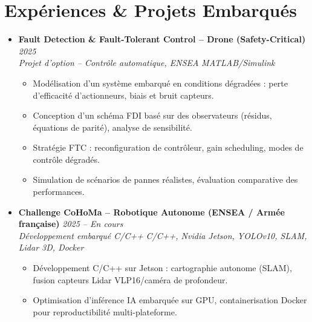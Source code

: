 \documentclass[a4paper,11pt]{article}
\begin{document}
\section{Expériences \& Projets Embarqués}
\begin{itemize}[leftmargin=*, label={-}]

\item \textbf{Fault Detection \& Fault-Tolerant Control -- Drone (Safety-Critical)} \hfill \textit{2025} \\
\textit{Projet d'option -- Contrôle automatique, ENSEA} \hfill \textit{MATLAB/Simulink}
\vspace{-2pt}
    \begin{itemize}[leftmargin=0.4cm, nosep, label=\tiny$\bullet$]
        \item \small{Modélisation d'un système embarqué en conditions dégradées : perte d'efficacité d'actionneurs, biais et bruit capteurs.}
        \item \small{Conception d'un schéma FDI basé sur des observateurs (résidus, équations de parité), analyse de sensibilité.}
        \item \small{Stratégie FTC : reconfiguration de contrôleur, gain scheduling, modes de contrôle dégradés.}
        \item \small{Simulation de scénarios de pannes réalistes, évaluation comparative des performances.}
    \end{itemize}
\vspace{3pt}

\item \textbf{Challenge CoHoMa -- Robotique Autonome (ENSEA / Armée française)} \hfill \textit{2025 -- En cours} \\
\textit{Développement embarqué C/C++} \hfill \textit{C/C++, Nvidia Jetson, YOLOv10, SLAM, Lidar 3D, Docker}
\vspace{-2pt}
    \begin{itemize}[leftmargin=0.4cm, nosep, label=\tiny$\bullet$]
        \item \small{Développement C/C++ sur Jetson : cartographie autonome (SLAM), fusion capteurs Lidar VLP16/caméra de profondeur.}
        \item \small{Optimisation d'inférence IA embarquée sur GPU, containerisation Docker pour reproductibilité multi-plateforme.}
    \end{itemize}
\vspace{3pt}


\end{itemize}
\end{document}
